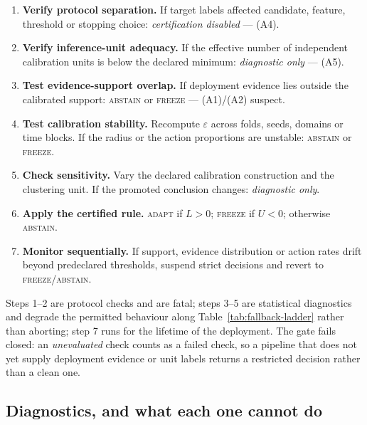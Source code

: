 \begin{enumerate}\itemsep2pt
  \item \textbf{Verify protocol separation.} If target labels affected candidate,
    feature, threshold or stopping choice: \emph{certification disabled} --- (A4).
  \item \textbf{Verify inference-unit adequacy.} If the effective number of independent
    calibration units is below the declared minimum: \emph{diagnostic only} --- (A5).
  \item \textbf{Test evidence-support overlap.} If deployment evidence lies outside the
    calibrated support: \textsc{abstain} or \textsc{freeze} --- (A1)/(A2) suspect.
  \item \textbf{Test calibration stability.} Recompute $\varepsilon$ across folds, seeds,
    domains or time blocks. If the radius or the action proportions are unstable:
    \textsc{abstain} or \textsc{freeze}.
  \item \textbf{Check sensitivity.} Vary the declared calibration construction and the
    clustering unit. If the promoted conclusion changes: \emph{diagnostic only}.
  \item \textbf{Apply the certified rule.} \textsc{adapt} if $L>0$; \textsc{freeze} if
    $U<0$; otherwise \textsc{abstain}.
  \item \textbf{Monitor sequentially.} If support, evidence distribution or action rates
    drift beyond predeclared thresholds, suspend strict decisions and revert to
    \textsc{freeze}/\textsc{abstain}.
\end{enumerate}

\smallskip
\noindent Steps 1--2 are protocol checks and are fatal; steps 3--5 are statistical
diagnostics and degrade the permitted behaviour along Table~\ref{tab:fallback-ladder}
rather than aborting; step 7 runs for the lifetime of the deployment. The gate fails
closed: an \emph{unevaluated} check counts as a failed check, so a pipeline that does not
yet supply deployment evidence or unit labels returns a restricted decision rather than a
clean one.

\subsection{Diagnostics, and what each one cannot do}\label{sec:diagnostics}

